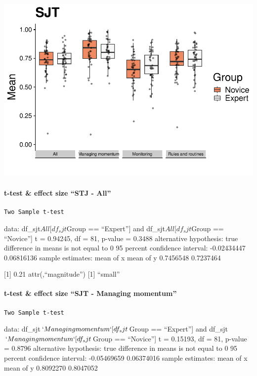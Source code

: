 \documentclass[
]{article}
\begin{document}
\includegraphics{expertise_2024_09_26_no_outlierdetection_MK_files/figure-latex/sjt-1.pdf}

\paragraph{t-test \& effect size ``STJ -
All''}\label{t-test-effect-size-stj---all}

\begin{verbatim}
Two Sample t-test
\end{verbatim}

data: df\_sjt\(All[df_sjt\)Group == ``Expert''{]} and
df\_sjt\(All[df_sjt\)Group == ``Novice''{]} t = 0.94245, df = 81,
p-value = 0.3488 alternative hypothesis: true difference in means is not
equal to 0 95 percent confidence interval: -0.02434447 0.06816136 sample
estimates: mean of x mean of y 0.7456548 0.7237464

{[}1{]} 0.21 attr(,``magnitude'') {[}1{]} ``small''

\paragraph{t-test \& effect size ``SJT - Managing
momentum''}\label{t-test-effect-size-sjt---managing-momentum}

\begin{verbatim}
Two Sample t-test
\end{verbatim}

data: df\_sjt\(`Managing momentum`[df_sjt\)Group == ``Expert''{]} and
df\_sjt\(`Managing momentum`[df_sjt\)Group == ``Novice''{]} t = 0.15193,
df = 81, p-value = 0.8796 alternative hypothesis: true difference in
means is not equal to 0 95 percent confidence interval: -0.05469659
0.06374016 sample estimates: mean of x mean of y 0.8092270 0.8047052
\end{document}
